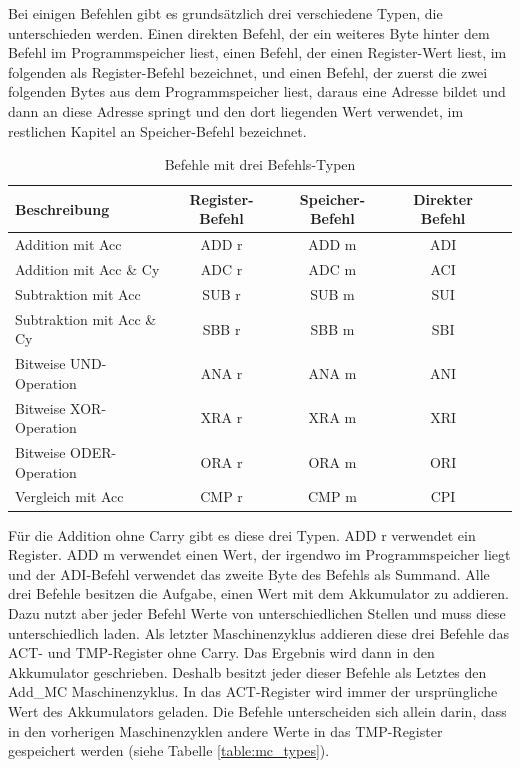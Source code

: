 \documentclass[12pt]{article}
\newcommand{\imgSpaceBefore}{\vspace{10pt}}
\begin{document}
\noindent
Bei einigen Befehlen gibt es grundsätzlich drei verschiedene Typen, die unterschieden werden. Einen direkten Befehl, der ein weiteres Byte hinter dem Befehl im Programmspeicher liest, einen Befehl, der einen Register-Wert liest, im folgenden als Register-Befehl bezeichnet, und einen Befehl, der zuerst die zwei folgenden Bytes aus dem Programmspeicher liest, daraus eine Adresse bildet und dann an diese Adresse springt und den dort liegenden Wert verwendet, im restlichen Kapitel an Speicher-Befehl bezeichnet.

\imgSpaceBefore
\begin{table}[H]
\centering
\begin{tabular}{|l c c c|c| } 
 \hline
 Beschreibung & Register-Befehl & Speicher-Befehl & Direkter Befehl \\
 \hline 
 Addition mit Acc & ADD r & ADD m & ADI \\ 
 Addition mit Acc \& Cy & ADC r & ADC m & ACI \\ 
 Subtraktion mit Acc & SUB r & SUB m & SUI \\ 
 Subtraktion mit Acc \& Cy & SBB r & SBB m & SBI \\ 
 Bitweise UND-Operation & ANA r & ANA m & ANI \\ 
 Bitweise XOR-Operation & XRA r & XRA m & XRI \\ 
 Bitweise ODER-Operation & ORA r & ORA m & ORI \\ 
 Vergleich mit Acc & CMP r & CMP m & CPI \\ 
 \hline
\end{tabular}
\caption{Befehle mit drei Befehls-Typen}
\label{table:instr_types}
\end{table}

\noindent
Für die Addition ohne Carry gibt es diese drei Typen. ADD r verwendet ein Register. ADD m verwendet einen Wert, der irgendwo im Programmspeicher liegt und der ADI-Befehl verwendet das zweite Byte des Befehls als Summand. Alle drei Befehle besitzen die Aufgabe, einen Wert mit dem Akkumulator zu addieren. Dazu nutzt aber jeder Befehl Werte von unterschiedlichen Stellen und muss diese unterschiedlich laden. 
Als letzter Maschinenzyklus addieren diese drei Befehle das ACT- und TMP-Register ohne Carry. Das Ergebnis wird dann in den Akkumulator geschrieben. Deshalb besitzt jeder dieser Befehle als Letztes den Add\_MC Maschinenzyklus.
In das ACT-Register wird immer der ursprüngliche Wert des Akkumulators geladen. Die Befehle unterscheiden sich allein darin, dass in den vorherigen Maschinenzyklen andere Werte in das TMP-Register gespeichert werden (siehe Tabelle \ref{table:mc_types}).
\\
\end{document}
